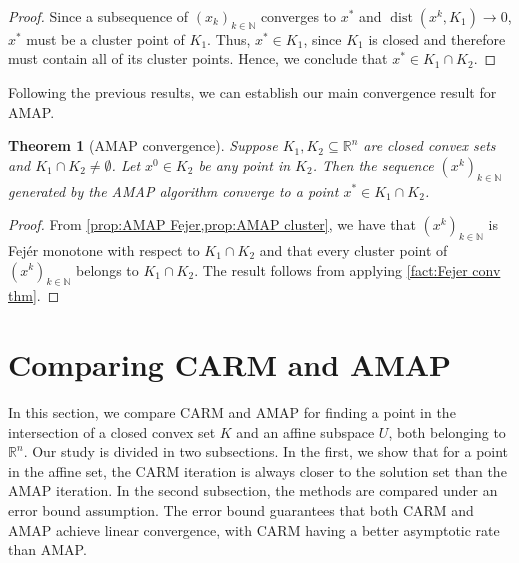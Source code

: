 \documentclass[smallextended,numbook,nospthms]{svjour3}
\theoremstyle{plain}
\newtheorem{theorem}{Theorem}[section]
\theoremstyle{definition}
\def\RR{\mathds R}
\def\NN{\mathds N}
\DeclareMathOperator{\dist}{dist}
\begin{document}
\begin{proof}
Since a subsequence of $(x_k)_{k\in\NN}$ converges to $x^{*}$ and $\dist(x^{k},K_{1}) \rightarrow 0$, $x^{*}$ must be a cluster point of $K_{1}$. Thus, $x^{*} \in K_{1}$, since $K_{1}$ is closed and therefore must contain all of its cluster points. Hence,  we conclude that $x^{*} \in K_{1} \cap K_{2}$. 
\end{proof}


Following the previous results, we can establish our main convergence result for AMAP.

\begin{theorem}[AMAP convergence]\label{thm:AMAP conv} 
	Suppose $K_{1},K_{2} \subseteq \RR^{n}$ are closed convex sets and $K_{1} \cap K_{2} \neq \emptyset$. Let $x^{0} \in K_{2}$ be any point in $K_{2}$. Then the sequence $\left(x^{k}\right)_{k \in \NN}$ generated by the AMAP algorithm converge to a point $x^{*} \in K_{1} \cap K_{2}$.
\end{theorem}
\begin{proof}
	From \cref{prop:AMAP Fejer,prop:AMAP cluster}, we have that $\left(x^{k}\right)_{k \in \NN}$ is Fejér monotone with respect to $K_{1} \cap K_{2}$ and that every cluster point of $\left(x^{k}\right)_{k \in \NN}$ belongs to $K_{1} \cap K_{2}$. The result follows from applying \cref{fact:Fejer conv thm}.
\end{proof}




\newpage
\section{Comparing CARM and AMAP}\label{sec:comp}
In this section, we compare CARM and AMAP for finding a point in the intersection of a closed convex set $K$ and an affine subspace $U$, both belonging to $\RR^{n}$. Our study is divided in two subsections. In the first, we show that for a point in the affine set, the CARM iteration is always closer to the solution set than the AMAP iteration. In the second subsection, the methods are compared under an error bound assumption. The error bound guarantees that both CARM and AMAP achieve linear convergence, with CARM having a better asymptotic rate than AMAP.
\end{document}
